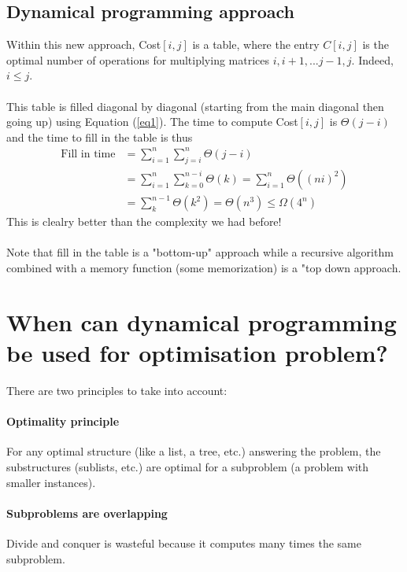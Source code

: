 \subsection{Dynamical programming approach}

Within this new approach, Cost$[i,j]$ is a table, where the entry $C[i,j]$ is the optimal number of operations for multiplying matrices $i,i+1,...j-1,j$. Indeed, $i\leq j$.
\\ \\
This table is filled diagonal by diagonal (starting from the main diagonal then going up) using Equation (\ref{eq1}). The time to compute Cost$[i,j]$ is $\Theta (j-i)$ and the time to fill in the table is thus 
\begin{align*}
\text{Fill in time} & = \sum_{i=1}^n \sum_{j=i}^n \Theta (j-i) \\
& = \sum_{i=1}^n \sum_{k=0}^{n-i} \Theta (k) = \sum_{i=1}^n \Theta ( (ni)^2) \\
& = \sum_k^{n-1} \Theta (k^2) = \Theta (n^3) \leq \Omega (4^n)
\end{align*} 
This is clealry better than the complexity we had before!
\\ \\
Note that fill in the table is a "bottom-up" approach while a recursive algorithm combined with a memory function (some memorization) is a "top down approach.

\section{When can dynamical programming be used for optimisation problem?}

There are two principles to take into account:

\paragraph{Optimality principle} For any optimal structure (like a list, a tree, etc.) answering the problem, the substructures (sublists, etc.) are optimal for a subproblem (a problem with smaller instances). 

\paragraph{Subproblems are overlapping} Divide and conquer is wasteful because it computes many times the same subproblem.

